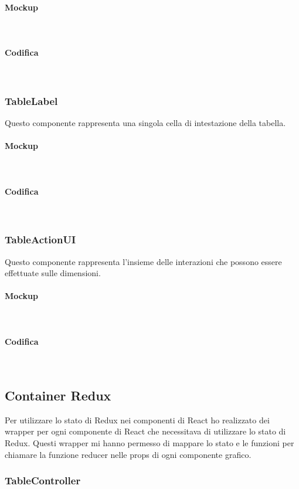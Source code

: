 \paragraph*{Mockup} \mbox{} \\
\paragraph*{Codifica} \mbox{} \\


\subsubsection{TableLabel}
Questo componente rappresenta una singola cella di intestazione della tabella.
\paragraph*{Mockup} \mbox{} \\
\paragraph*{Codifica} \mbox{} \\


\subsubsection{TableActionUI}
Questo componente rappresenta l'insieme delle interazioni che possono essere effettuate sulle dimensioni.
\paragraph*{Mockup} \mbox{} \\
\paragraph*{Codifica} \mbox{} \\


\subsection{Container Redux}
Per utilizzare lo stato di Redux nei componenti di React ho realizzato dei wrapper per ogni componente di React che necessitava di utilizzare lo stato di Redux. Questi wrapper mi hanno permesso di mappare lo stato e le funzioni per chiamare la funzione reducer nelle props di ogni componente grafico.
\subsubsection{TableController}
